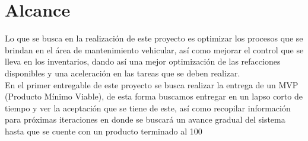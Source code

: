 \section{Alcance}
Lo que se busca en la realización de este proyecto es optimizar los procesos que se brindan en el área de mantenimiento vehicular, así como mejorar el control que se lleva en los inventarios, dando así   una mejor optimización de las refacciones disponibles y una aceleración en las tareas que se deben realizar.
\\
En el primer entregable de este proyecto se busca realizar la entrega de un MVP (Producto Mínimo Viable), de esta forma buscamos entregar en un lapso corto de tiempo y ver la aceptación que se tiene de este, así como recopilar información para próximas iteraciones en donde se buscará un avance gradual del sistema hasta que se cuente con un producto terminado al 100%
